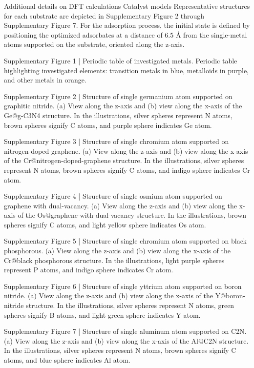 Additional details on DFT calculations
Catalyst models
Representative structures for each substrate are depicted in Supplementary Figure 2 through Supplementary Figure 7. For the adsorption process, the initial state is defined by positioning the optimized adsorbates at a distance of 6.5 Å from the single-metal atoms supported on the substrate, oriented along the z-axis.


Supplementary Figure 1 | Periodic table of investigated metals. Periodic table highlighting investigated elements: transition metals in blue, metalloids in purple, and other metals in orange.


Supplementary Figure 2 | Structure of single germanium atom supported on graphitic nitride. (a) View along the z-axis and (b) view along the x-axis of the Ge@g-C3N4 structure. In the illustrations, silver spheres represent N atoms, brown spheres signify C atoms, and purple sphere indicates Ge atom.


Supplementary Figure 3 | Structure of single chromium atom supported on nitrogen-doped graphene. (a) View along the z-axis and (b) view along the x-axis of the Cr@nitrogen-doped-graphene structure. In the illustrations, silver spheres represent N atoms, brown spheres signify C atoms, and indigo sphere indicates Cr atom.


Supplementary Figure 4 | Structure of single osmium atom supported on graphene with dual-vacancy. (a) View along the z-axis and (b) view along the x-axis of the Os@graphene-with-dual-vacancy structure. In the illustrations, brown spheres signify C atoms, and light yellow sphere indicates Os atom.





Supplementary Figure 5 | Structure of single chromium atom supported on black phosphorous. (a) View along the z-axis and (b) view along the x-axis of the Cr@black phosphorous structure. In the illustrations, light purple spheres represent P atoms, and indigo sphere indicates Cr atom.


Supplementary Figure 6 | Structure of single yttrium atom supported on boron nitride. (a) View along the z-axis and (b) view along the x-axis of the Y@boron-nitride structure. In the illustrations, silver spheres represent N atoms, green spheres signify B atoms, and light green sphere indicates Y atom.




Supplementary Figure 7 | Structure of single aluminum atom supported on C2N. (a) View along the z-axis and (b) view along the x-axis of the Al@C2N structure. In the illustrations, silver spheres represent N atoms, brown spheres signify C atoms, and blue sphere indicates Al atom.


